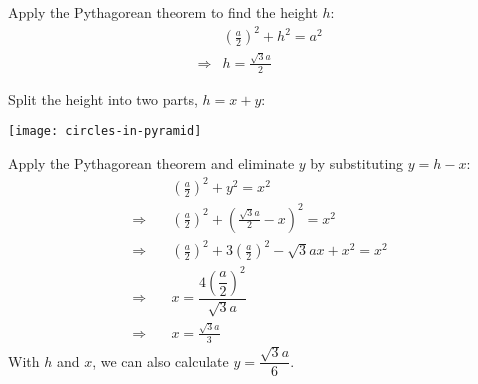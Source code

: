 \documentclass[12pt]{article}
\begin{document}
\begin{answer}
Apply the Pythagorean theorem to find the height $h$:
\begin{align*}
& \left(\frac{a}{2}\right)^2 + h^2 = a^2 \\
\Rightarrow 
& h = \frac{\sqrt{3}a}{2}
\end{align*}

Split the height into two parts, $h=x+y$:
\begin{center}
\texttt{[image: circles-in-pyramid]}
\end{center}
Apply the Pythagorean theorem and eliminate $y$ by substituting $y=h-x$:
\begin{align*}
& \left(\frac{a}{2}\right)^2 + y^2 = x^2 \\
\Rightarrow \quad
& \left(\frac{a}{2}\right)^2 + \left(\frac{\sqrt{3}a}{2}-x\right)^2 = x^2 \\
\Rightarrow \quad
& \left(\frac{a}{2}\right)^2 + 3 \left(\frac{a}{2}\right)^2 - \sqrt{3}ax + x^2 = x^2 \\[1em]
\Rightarrow \quad
& x = \dfrac{4\left(\dfrac{a}{2}\right)^2}{\sqrt{3}a} \\[1em]
\Rightarrow \quad
& x = \frac{\sqrt{3}a}{3}
\end{align*}
With $h$ and $x$, we can also calculate $y = \dfrac{\sqrt{3}a}{6}$.

\end{answer}
\end{document}
